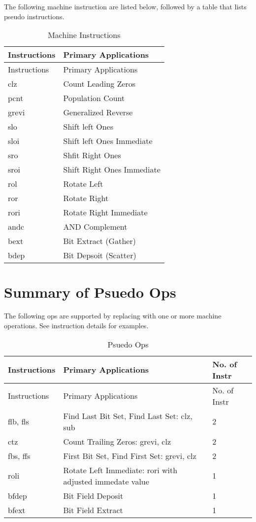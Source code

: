 The following machine instruction are listed below, followed by a table
that lists pseudo instructions.

\begin{longtable}[c]{@{}ll@{}}
\caption{Machine Instructions}\tabularnewline
\toprule
Instructions & Primary Applications\tabularnewline
\midrule
\endfirsthead
\toprule
Instructions & Primary Applications\tabularnewline
\midrule
\endhead
clz      & Count Leading Zeros\tabularnewline
pcnt     & Population Count\tabularnewline
grevi    & Generalized Reverse\tabularnewline
slo      & Shift left Ones\tabularnewline
sloi     & Shift left Ones Immediate\tabularnewline
sro      & Shfit Right Ones\tabularnewline
sroi     & Shift Right Ones Immediate\tabularnewline
rol      & Rotate Left\tabularnewline
ror      & Rotate Right\tabularnewline
rori     & Rotate Right Immediate\tabularnewline
andc     & AND Complement\tabularnewline
bext     & Bit Extract (Gather)\tabularnewline
bdep     & Bit Depsoit (Scatter)\tabularnewline
\bottomrule
\end{longtable}

\section{Summary of Psuedo Ops}

The following ops are supported by replacing with one or more machine
operations. See instruction details for examples.

\begin{longtable}[c]{@{}lll@{}}
\caption{Psuedo Ops}\tabularnewline
\toprule
Instructions & Primary Applications & No. of Instr\tabularnewline
\midrule
\endfirsthead
\toprule
Instructions & Primary Applications & No. of Instr\tabularnewline
\midrule
\endhead
flb, fls & Find Last Bit Set, Find Last Set: clz, sub                        & 2\tabularnewline
ctz      & Count Trailing Zeros: grevi, clz                                  & 2\tabularnewline
fbs, ffs & First Bit Set, Find First Set: grevi, clz                         & 2\tabularnewline
roli     & Rotate Left Immediate: rori with adjusted immedate value          & 1\tabularnewline
bfdep    & Bit Field Deposit                                                 & 1\tabularnewline
bfext    & Bit Field Extract                                                 & 1\tabularnewline
\bottomrule
\end{longtable}
